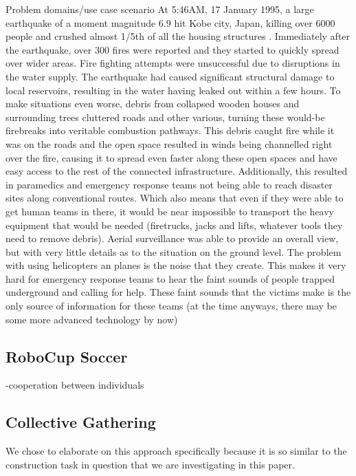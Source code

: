Problem domains/use case scenario
At 5:46AM, 17 January 1995, a large earthquake of a moment magnitude 6.9 hit Kobe city, Japan, killing over 6000 people and crushed almost 1/5th of all the housing structures \cite{KitanoTadokoro1999}.
Immediately after the earthquake, over 300 fires were reported and they started to quickly spread over wider areas. Fire fighting attempts were unsuccessful due to disruptions in the water supply. The earthquake had caused significant structural damage to local reservoirs, resulting in the water having leaked out within a few hours.
To make situations even worse, debris from collapsed wooden houses and surrounding trees cluttered roads and other various, turning these would-be firebreaks into veritable combustion pathways. This debris caught fire while it was on the roads and the open space resulted in winds being channelled right over the fire, causing it to spread even faster along these open spaces and have easy access to the rest of the connected infrastructure.
Additionally, this resulted in paramedics and emergency response teams not being able to reach disaster sites along conventional routes. Which also means that even if they were able to get human teams in there, it would be near impossible to transport the heavy equipment that would be needed (firetrucks, jacks and lifts, whatever tools they need to remove debris).
Aerial surveillance was able to provide an overall view, but with very little details as to the situation on the ground level.
The problem with using helicopters an planes is the noise that they create. This makes it very hard for emergency response teams to hear the faint sounds of people trapped underground and calling for help. These faint sounds that the victims make is the only source of information for these teams (at the time anyways, there may be some more advanced technology by now)


\subsection{RoboCup Soccer}
-cooperation between individuals





\subsection{Collective Gathering}

We chose to elaborate on this approach specifically because it is so similar to the construction task in question that we are investigating in this paper.

